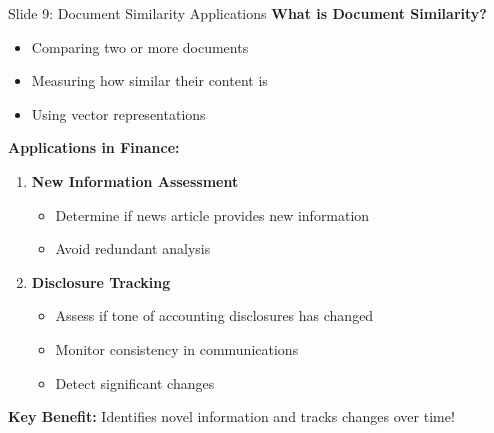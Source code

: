 \documentclass[8pt]{beamer}
\begin{document}
	\begin{frame}{Slide 9: Document Similarity Applications}
		\fontsize{6.5}{7.5}\selectfont
		\textbf{What is Document Similarity?}
		\begin{itemize}
			\item Comparing two or more documents
			\item Measuring how similar their content is
			\item Using vector representations
		\end{itemize}
		
		\vspace{0.1cm}
		\textbf{Applications in Finance:}
		\begin{enumerate}
			\item \textbf{New Information Assessment}
			\begin{itemize}
				\item Determine if news article provides new information
				\item Avoid redundant analysis
			\end{itemize}
			\item \textbf{Disclosure Tracking}
			\begin{itemize}
				\item Assess if tone of accounting disclosures has changed
				\item Monitor consistency in communications
				\item Detect significant changes
			\end{itemize}
		\end{enumerate}
		
		\textcolor{myblue}{\textbf{Key Benefit:}} Identifies novel information and tracks changes over time!
	\end{frame}
	
\end{document}
